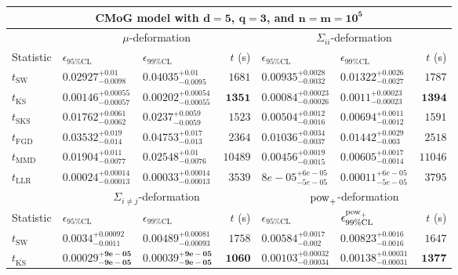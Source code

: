 \begin{tabular}{l|llr|llr}
	\toprule
	\multicolumn{7}{c}{{\bf CMoG model with $\mathbf{d=5}$, $\mathbf{q=3}$, and $\mathbf{n=m=10^{5}}$}} \\
	\toprule
	\multicolumn{1}{c}{} & \multicolumn{3}{c}{$\mu$-deformation} & \multicolumn{3}{c}{$\Sigma_{ii}$-deformation} \\
	Statistic & $\epsilon_{95\%\mathrm{CL}}$ & $\epsilon_{99\%\mathrm    {CL}}$ & $t$ (s) & $\epsilon_{95\%\mathrm{CL}}$ & $\epsilon_{99\%\mathrm{CL}}$ & $t$ (s) \\
	\midrule
	$t_{\mathrm{SW}}$ & $0.02927_{-0.0098}^{+0.01}$ & $0.04035_{-0.0095}^{+0.01}$ & $1681$ & $0.00935_{-0.0032}^{+0.0028}$ & $0.01322_{-0.0027}^{+0.0026}$ & $1787$ \\
	$t_{\overline{\mathrm{KS}}}$ & ${\mathbf{0.00146_{-0.00057}^{+0.00055}}}$ & ${\mathbf{0.00202_{-0.00055}^{+0.00054}}}$ & ${\mathbf{1351}}$ & ${\mathbf{0.00084_{-0.00026}^{+0.00023}}}$ & ${\mathbf{0.0011_{-0.00023}^{+0.00023}}}$ & ${\mathbf{1394}}$ \\
	$t_{\mathrm{SKS}}$ & $0.01762_{-0.0062}^{+0.0061}$ & $0.0237_{-0.0059}^{+0.0059}$ & $1523$ & $0.00504_{-0.0016}^{+0.0012}$ & $0.00694_{-0.0012}^{+0.0011}$ & $1591$ \\
	$t_{\mathrm{FGD}}$ & $0.03532_{-0.014}^{+0.019}$ & $0.04753_{-0.013}^{+0.017}$ & $2364$ & $0.01036_{-0.0037}^{+0.0034}$ & $0.01442_{-0.003}^{+0.0029}$ & $2518$ \\
	$t_{\mathrm{MMD}}$ & $0.01904_{-0.0077}^{+0.011}$ & $0.02548_{-0.0076}^{+0.01}$ & $10489$ & $0.00456_{-0.0015}^{+0.0019}$ & $0.00605_{-0.0014}^{+0.0017}$ & $11046$ \\
	$t_{\mathrm{LLR}}$ & $0.00024_{-0.00013}^{+0.00014}$ & $0.00033_{-0.00013}^{+0.00014}$ & $3539$ & $8e-05_{-5e-05}^{+6e-05}$ & $0.00011_{-5e-05}^{+6e-05}$ & $3795$ \\
	\toprule
	\multicolumn{1}{c}{} & \multicolumn{3}{c}{$\Sigma_{i\neq j}$-deformation} & \multicolumn{3}{c}{$\rm{pow}_{+}$-deformation} \\
	Statistic & $\epsilon_{95\%\mathrm{CL}}$ & $\epsilon_{99\%\mathrm{CL}}$ & $t$ (s) & $\epsilon_{95\%\mathrm{CL}}$ & $\epsilon^{\rm   {pow}_{+}}_{99\%\mathrm{CL}}$ & $t$ (s) \\
	\midrule
	$t_{\mathrm{SW}}$ & $0.0034_{-0.0011}^{+0.00092}$ & $0.00489_{-0.00093}^{+0.00081}$ & $1758$ & $0.00584_{-0.002}^{+0.0017}$ & $0.00823_{-0.0016}^{+0.0016}$ & $1647$ \\
	$t_{\overline{\mathrm{KS}}}$ & ${\mathbf{0.00029_{-9e-05}^{+9e-05}}}$ & ${\mathbf{0.00039_{-9e-05}^{+9e-05}}}$ & ${\mathbf{1060}}$ & ${\mathbf{0.00103_{-0.00034}^{+0.00032}}}$ & ${\mathbf{0.00138_{-0.00031}^{+0.00031}}}$ & ${\mathbf{1377}}$ \\

\end{tabular}
